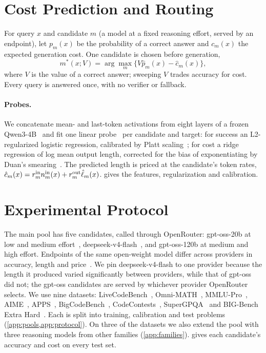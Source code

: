 \documentclass[10pt]{article}
\begin{document}
\section{Cost Prediction and Routing}
For query $x$ and candidate $m$ (a model at a fixed reasoning effort, served by an endpoint), let $p_m(x)$ be the probability of a correct answer and $c_m(x)$ the expected generation cost. One candidate is chosen before generation,
\begin{equation}
m^*(x;V)=\arg\max_m\{V\hat p_m(x)-\hat c_m(x)\},
\label{eq:route}
\end{equation}
where $V$ is the value of a correct answer; sweeping $V$ trades accuracy for cost. Every query is answered once, with no verifier or fallback.

\paragraph{Probes.}
We concatenate mean- and last-token activations from eight layers of a frozen Qwen3-4B~\citep{qwen3} and fit one linear probe~\citep{alain2016probes} per candidate and target: for success an L2-regularized logistic regression, calibrated by Platt scaling~\citep{platt1999}; for cost a ridge regression of log mean output length, corrected for the bias of exponentiating by Duan's smearing~\citep{duan1983}. The predicted length is priced at the candidate's token rates, $\hat c_m(x)=r_m^{\rm in}n^{\rm in}_m(x)+r_m^{\rm out}\hat\ell_m(x)$.  gives the features, regularization and calibration.

\section{Experimental Protocol}\label{sec:protocol}
The main pool has five candidates, called through OpenRouter: gpt-oss-20b at low and medium effort~\citep{gptoss}, deepseek-v4-flash~\citep{deepseekv4}, and gpt-oss-120b at medium and high effort. Endpoints of the same open-weight model differ across providers in accuracy, length and price~\citep{samemodel,gateways}. We pin deepseek-v4-flash to one provider because the length it produced varied significantly between providers, while that of gpt-oss did not; the gpt-oss candidates are served by whichever provider OpenRouter selects. We use nine datasets: LiveCodeBench~\citep{lcb}, Omni-MATH~\citep{omni}, MMLU-Pro~\citep{mmlupro}, AIME~\citep{aime}, APPS~\citep{apps}, BigCodeBench~\citep{bigcodebench}, CodeContests~\citep{codecontests}, SuperGPQA~\citep{supergpqa} and BIG-Bench Extra Hard~\citep{bbeh}. Each is split into training, calibration and test problems (\cref{app:pools,app:protocol}). On three of the datasets we also extend the pool with three reasoning models from other families (\cref{app:families}).  gives each candidate's accuracy and cost on every test set.
\end{document}
